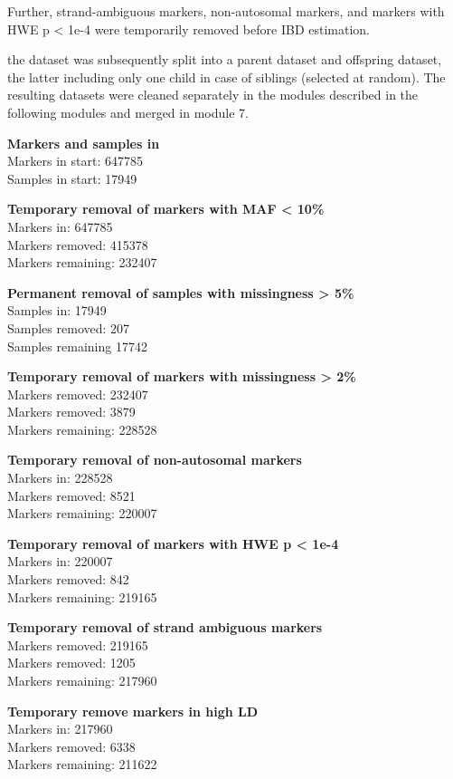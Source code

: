 \documentclass[]{article}
\begin{document}
Further, strand-ambiguous markers, non-autosomal markers, and markers
with HWE p \textless{} 1e-4 were temporarily removed before IBD
estimation.

the dataset was subsequently split into a parent dataset and offspring
dataset, the latter including only one child in case of siblings
(selected at random). The resulting datasets were cleaned separately in
the modules described in the following modules and merged in module 7.

\textbf{Markers and samples in}\\
Markers in start: 647785\\
Samples in start: 17949

\textbf{Temporary removal of markers with MAF \textless{} 10\%}\\
Markers in: 647785\\
Markers removed: 415378\\
Markers remaining: 232407

\textbf{Permanent removal of samples with missingness \textgreater{}
5\%}\\
Samples in: 17949\\
Samples removed: 207\\
Samples remaining 17742

\textbf{Temporary removal of markers with missingness \textgreater{}
2\%}\\
Markers removed: 232407\\
Markers removed: 3879\\
Markers remaining: 228528

\textbf{Temporary removal of non-autosomal markers}\\
Markers in: 228528\\
Markers removed: 8521\\
Markers remaining: 220007

\textbf{Temporary removal of markers with HWE p \textless{} 1e-4}\\
Markers in: 220007\\
Markers removed: 842\\
Markers remaining: 219165

\textbf{Temporary removal of strand ambiguous markers}\\
Markers removed: 219165\\
Markers removed: 1205\\
Markers remaining: 217960

\textbf{Temporary remove markers in high LD}\\
Markers in: 217960\\
Markers removed: 6338\\
Markers remaining: 211622
\end{document}
